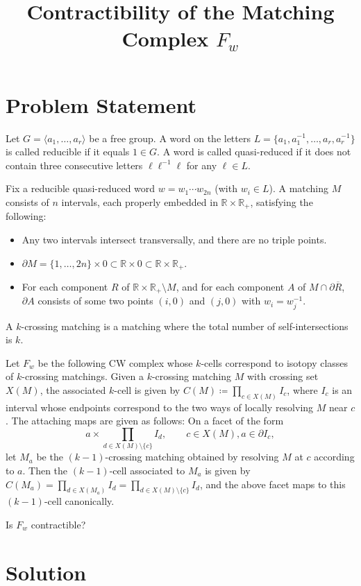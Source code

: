 \documentclass[12pt]{article}
\title{Contractibility of the Matching Complex $F_w$}
\author{}
\date{}
\newcommand{\RR}{\mathbb{R}}
\newcommand{\bdy}{\partial}
\newcommand{\defeq}{\coloneqq}
\begin{document}
\maketitle

\section*{Problem Statement}

Let $G=\langle a_1,\dots,a_r\rangle$ be a free group. A word on the
letters $L=\{a_1,a_1^{-1},\dots,a_r,a_r^{-1}\}$ is called reducible
if it equals $1\in G$. A word is called quasi-reduced if it does not
contain three consecutive letters $\ell\ell^{-1}\ell$ for any
$\ell \in L$.

Fix a reducible quasi-reduced word $w=w_1\cdots w_{2n}$ (with $w_i\in L$). A
matching $M$ consists of $n$ intervals, each properly embedded in
$\RR\times\RR_+$, satisfying the following:
\begin{itemize}
\item Any two intervals intersect
  transversally, and there are no triple points.
\item $\bdy M=\{1,\dots,2n\}\times 0\subset\RR\times 0\subset
  \RR\times\RR_+$.
\item For each component $R$ of
  $\RR\times\RR_+\setminus M$, and for each component $A$ of $M\cap \bdy\overline{R}$, $\bdy A$ consists of some two points $(i,0)$ and $(j,0)$ with $w_i=w_j^{-1}$. 
\end{itemize}
A $k$-crossing
matching is a matching where the total number of self-intersections
is $k$.

Let $F_w$ be the following CW complex whose $k$-cells correspond to
isotopy classes of $k$-crossing matchings. Given a $k$-crossing
matching $M$ with crossing set $X(M)$, the associated $k$-cell is
given by $C(M)\defeq \prod_{c\in X(M)}I_c$, where $I_c$ is an
interval whose endpoints correspond to the two ways of locally
resolving $M$ near $c$. The attaching maps are given as follows: On
a facet of the form
\[
  a\times\prod_{d\in X(M)\setminus\{c\}}I_{d},\qquad c\in X(M),a\in \bdy I_c,
\]
let $M_a$ be the $(k-1)$-crossing matching obtained by resolving $M$
at $c$ according to $a$. Then the $(k-1)$-cell associated to $M_a$
is given by
$C(M_a)=\prod_{d\in X(M_a)}I_d=\prod_{d\in X(M)\setminus\{c\}}I_{d}$, and the
above facet maps to this $(k-1)$-cell canonically.

Is $F_w$ contractible?

\section*{Solution}
\end{document}

